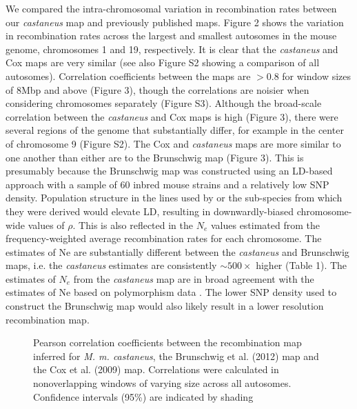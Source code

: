 We compared the intra-chromosomal variation in recombination rates between our \textit{castaneus} map and previously published maps. Figure 2 shows the variation in recombination rates across the largest and smallest autosomes in the mouse genome, chromosomes 1 and 19, respectively. It is clear that the \textit{castaneus} and Cox maps are very similar (see also Figure S2 showing a comparison of all autosomes). Correlation coefficients between the maps are $>$0.8 for window sizes of 8Mbp and above (Figure 3), though the correlations are noisier when considering chromosomes separately (Figure S3). Although the broad-scale correlation between the \textit{castaneus} and Cox maps is high (Figure 3), there were several regions of the genome that substantially differ, for example in the center of chromosome 9 (Figure S2). The Cox and \textit{castaneus} maps are more similar to one another than either are to the Brunschwig map (Figure 3). This is presumably because the Brunschwig map was constructed using an LD-based approach with a sample of 60 inbred mouse strains and a relatively low SNP density. Population structure in the lines used by \cite{RN156} or the sub-species from which they were derived would elevate LD, resulting in downwardly-biased chromosome-wide values of $\rho$. This is also reflected in the $N_e$ values estimated from the frequency-weighted average recombination rates for each chromosome. The estimates of Ne are substantially different between the \textit{castaneus} and Brunschwig maps, i.e. the \textit{castaneus} estimates are consistently $\sim500\times$ higher (Table 1). The estimates of $N_e$ from the \textit{castaneus} map are in broad agreement with the estimates of Ne based on polymorphism data \citep{RN255,RN315}. The lower SNP density used to construct the Brunschwig map would also likely result in a lower resolution recombination map.

\linespread{1}
\begin{figure}[h]
   \centering      
   \noindent{}
 \caption[Broad-scale correlations between recombiantion maps for \emph{Mus musculus castaneus} and \emph{Mus musculus domesticus}]{Pearson correlation coefficients between the recombination map inferred for \emph{M. m. castaneus}, the Brunschwig et al. (2012) map and the Cox et al. (2009) map. Correlations were calculated in nonoverlapping windows of varying size across all autosomes. Confidence intervals (95\%) are indicated by shading}
\end{figure}
\linespread{2}

